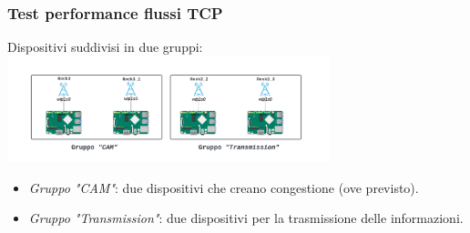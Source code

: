 \documentclass[aspectratio=169]{beamer}
\begin{document}
\begin{frame}
    \frametitle{Test performance flussi TCP}
    \vfill
    \centering
    \begin{minipage}{0.9\textwidth}
        \centering
        Dispositivi suddivisi in due gruppi:
        \includegraphics[width=0.7\textwidth]{Rock scheme.png}
        \begin{itemize}
            \item \textit{Gruppo "CAM"}: due dispositivi che creano congestione (ove previsto).
            \item \textit{Gruppo "Transmission"}: due dispositivi per la trasmissione delle informazioni.
        \end{itemize}
    \end{minipage}
    \vfill
\end{frame}
\end{document}
